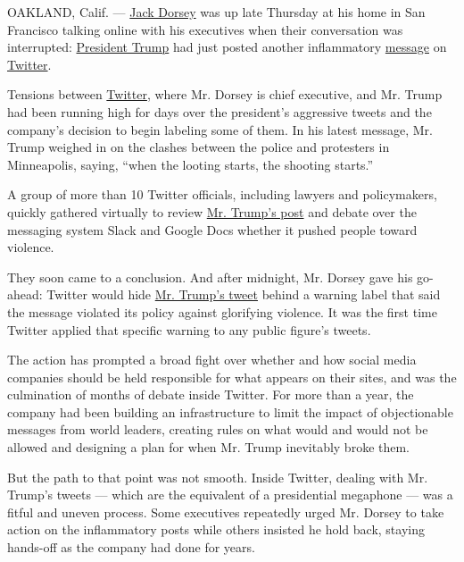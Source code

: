 OAKLAND, Calif. ---
\href{https://www.nytimes.com/2020/06/23/technology/trump-twitter-label-seattle.html}{Jack
Dorsey} was up late Thursday at his home in San Francisco talking online
with his executives when their conversation was interrupted:
\href{https://www.nytimes.com/2020/06/23/technology/trump-twitter-label-seattle.html}{President
Trump} had just posted another inflammatory
\href{https://twitter.com/realDonaldTrump/status/1266231100780744704}{message}
on
\href{https://www.nytimes.com/2020/06/09/us/politics/trump-twitter.html}{Twitter}.

Tensions between
\href{https://www.nytimes.com/2020/06/10/technology/trump-twitter-protests.html}{Twitter},
where Mr. Dorsey is chief executive, and Mr. Trump had been running high
for days over the president's aggressive tweets and the company's
decision to begin labeling some of them. In his latest message, Mr.
Trump weighed in on the clashes between the police and protesters in
Minneapolis, saying, ``when the looting starts, the shooting starts.''

A group of more than 10 Twitter officials, including lawyers and
policymakers, quickly gathered virtually to review
\href{https://www.nytimes.com/2020/06/03/us/politics/trump-twitter-fact-check.html}{Mr.
Trump's post} and debate over the messaging system Slack and Google Docs
whether it pushed people toward violence.

They soon came to a conclusion. And after midnight, Mr. Dorsey gave his
go-ahead: Twitter would hide
\href{https://www.nytimes.com/2020/06/03/us/politics/trump-twitter-fact-check.html}{Mr.
Trump's tweet} behind a warning label that said the message violated its
policy against glorifying violence. It was the first time Twitter
applied that specific warning to any public figure's tweets.

The action has prompted a broad fight over whether and how social media
companies should be held responsible for what appears on their sites,
and was the culmination of months of debate inside Twitter. For more
than a year, the company had been building an infrastructure to limit
the impact of objectionable messages from world leaders, creating rules
on what would and would not be allowed and designing a plan for when Mr.
Trump inevitably broke them.

But the path to that point was not smooth. Inside Twitter, dealing with
Mr. Trump's tweets --- which are the equivalent of a presidential
megaphone --- was a fitful and uneven process. Some executives
repeatedly urged Mr. Dorsey to take action on the inflammatory posts
while others insisted he hold back, staying hands-off as the company had
done for years.


